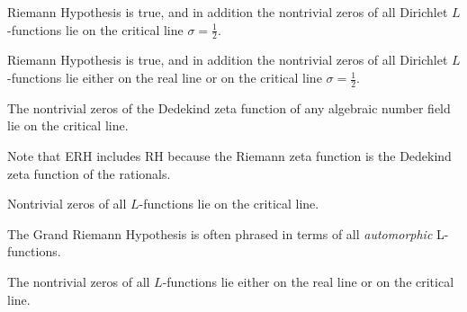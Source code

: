 \documentclass[12pt,letterpaper, reqno]{aimpl}
\begin{document}
\begin{problemblock}
\begin{problem}[1.2]
Riemann Hypothesis is true, and in addition the
nontrivial zeros of
all Dirichlet $L$-functions
lie on the critical line $\sigma=\frac12$.
\end{problem}


\end{problemblock}

\begin{problemblock}
\begin{problem}[1.3]
Riemann Hypothesis is true, and in addition the
nontrivial zeros of
all Dirichlet $L$-functions
lie either on the real line or on the critical line $\sigma=\frac12$.
\end{problem}
\end{problemblock}


\begin{problemblock}
\begin{problem}[1.4]
The nontrivial zeros of the Dedekind zeta function
of any algebraic number field lie on the critical line.
\end{problem}


Note that ERH includes RH because the Riemann zeta function is
the Dedekind zeta function of the rationals.

\end{problemblock}

\begin{problemblock}
\begin{problem}[1.5]
Nontrivial zeros of all $L$-functions
lie on the critical line.
\end{problem}

The Grand Riemann Hypothesis is often phrased in terms of
all \emph{automorphic} L-functions.  
\end{problemblock}

\begin{problemblock}
\begin{problem}[1.6]
The nontrivial zeros of all $L$-functions
lie either on the real line or on the critical line.
\end{problem}

\end{problemblock}
\end{document}
